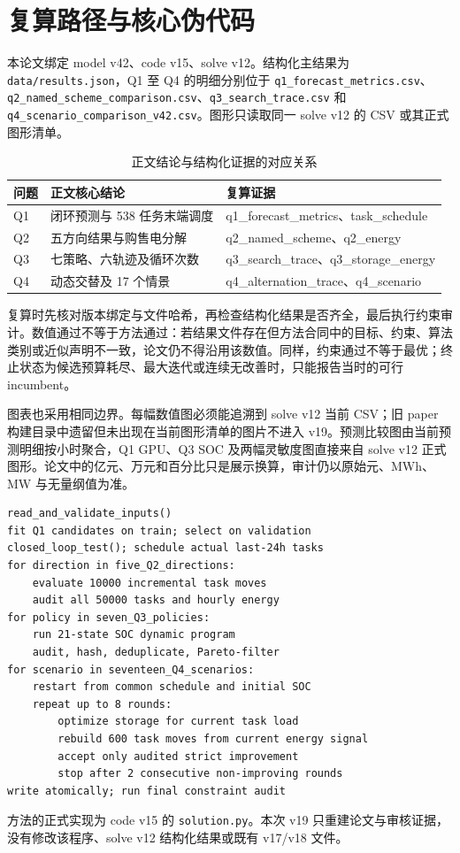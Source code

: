 \appendix
\section{复算路径与核心伪代码}
本论文绑定 model v42、code v15、solve v12。结构化主结果为 \texttt{data/results.json}，Q1 至 Q4 的明细分别位于 \texttt{q1\_forecast\_metrics.csv}、\texttt{q2\_named\_scheme\_comparison.csv}、\texttt{q3\_search\_trace.csv} 和 \texttt{q4\_scenario\_comparison\_v42.csv}。图形只读取同一 solve v12 的 CSV 或其正式图形清单。


\begin{table}[H]\centering\small
\caption{正文结论与结构化证据的对应关系}
\begin{tabular}{lll}\toprule
问题 & 正文核心结论 & 复算证据\\\midrule
Q1 & 闭环预测与 538 任务末端调度 & q1\_forecast\_metrics、task\_schedule\\
Q2 & 五方向结果与购售电分解 & q2\_named\_scheme、q2\_energy\\
Q3 & 七策略、六轨迹及循环次数 & q3\_search\_trace、q3\_storage\_energy\\
Q4 & 动态交替及 17 个情景 & q4\_alternation\_trace、q4\_scenario\\\bottomrule
\end{tabular}
\end{table}

复算时先核对版本绑定与文件哈希，再检查结构化结果是否齐全，最后执行约束审计。数值通过不等于方法通过：若结果文件存在但方法合同中的目标、约束、算法类别或近似声明不一致，论文仍不得沿用该数值。同样，约束通过不等于最优；终止状态为候选预算耗尽、最大迭代或连续无改善时，只能报告当时的可行 incumbent。

图表也采用相同边界。每幅数值图必须能追溯到 solve v12 当前 CSV；旧 paper 构建目录中遗留但未出现在当前图形清单的图片不进入 v19。预测比较图由当前预测明细按小时聚合，Q1 GPU、Q3 SOC 及两幅灵敏度图直接来自 solve v12 正式图形。论文中的亿元、万元和百分比只是展示换算，审计仍以原始元、MWh、MW 与无量纲值为准。

\begin{verbatim}
read_and_validate_inputs()
fit Q1 candidates on train; select on validation
closed_loop_test(); schedule actual last-24h tasks
for direction in five_Q2_directions:
    evaluate 10000 incremental task moves
    audit all 50000 tasks and hourly energy
for policy in seven_Q3_policies:
    run 21-state SOC dynamic program
    audit, hash, deduplicate, Pareto-filter
for scenario in seventeen_Q4_scenarios:
    restart from common schedule and initial SOC
    repeat up to 8 rounds:
        optimize storage for current task load
        rebuild 600 task moves from current energy signal
        accept only audited strict improvement
        stop after 2 consecutive non-improving rounds
write atomically; run final constraint audit
\end{verbatim}

方法的正式实现为 code v15 的 \texttt{solution.py}。本次 v19 只重建论文与审核证据，没有修改该程序、solve v12 结构化结果或既有 v17/v18 文件。
